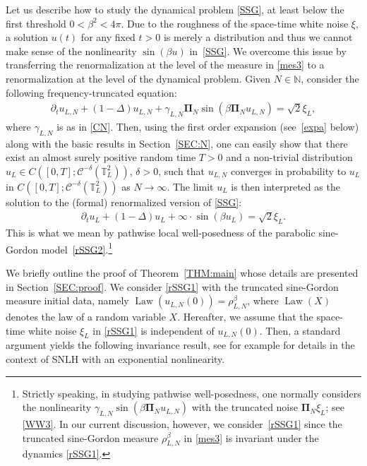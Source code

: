 \documentclass[letterpaper, 11pt,  reqno]{amsart}
\theoremstyle{myremark}
\newcommand{\1}{\hspace{0.5mm}\text{I}\hspace{0.5mm}}
\newcommand{\T}{\mathbb{T}}
\newcommand{\CC}{\mathcal{C}}
\newcommand{\Pii}{\mathbf{\Pi}}
\newcommand{\be}{\beta}
\newcommand{\dl}{\delta}
\newcommand{\Dl}{\Delta}
\newcommand{\g}{\gamma}
\newcommand{\dt}{\partial_t}
\newcommand{\N}{\mathbb{N}}
\DeclareMathOperator{\Law}{Law}
\numberwithin{equation}{section}
\numberwithin{theorem}{section}
\begin{document}
Let us describe  how to study the dynamical problem \eqref{SSG}, 
at least below the first threshold $0 < \be^2 < 4\pi$. %
Due to the roughness of the space-time white noise $\xi$, 
a solution $u(t)$ for any fixed $t > 0$ is merely a distribution and 
thus we cannot make sense of the nonlinearity $\sin(\be u)$ in~\eqref{SSG}. 
We  overcome this issue by 
transferring  the renormalization  at the level of the measure 
in  \eqref{mes3}
 to a renormalization  at the level of the dynamical problem.
Given $N \in \N$, consider the following 
 frequency-truncated equation:
\begin{align}
 \dt u_{L, N}  + (1-\Dl)  u_{L, N} 
+ \g_{L, N} \Pii_{N} \sin (\be \Pii_{N} u_{L, N})  = \sqrt{2} \xi_L , 
\label{rSSG1}
\end{align}
where $\g_{L, N}$ is as in \eqref{CN}.
Then, 
using the first order expansion (see~\eqref{expa} below)
along with the basic results in Section~\ref{SEC:N}, 
one can easily show
 that there exist an almost surely positive random time $T>0$ and a non-trivial distribution 
$u_L \in C([0,T]; \CC^{-\dl}(\T_L^2))$, $\dl > 0$, such that 
$u_{L, N}$ converges 
in probability 
to $u_L$
in 
$C([0,T]; \CC^{-\dl}(\T_L^2))$ as $N \to \infty$.
The limit $u_L$ is then interpreted as the solution to the (formal) renormalized version of \eqref{SSG}:
\begin{align}
\dt u_L +(1-\Dl) u_L   +  \infty\cdot  \sin(\be u_L) = \sqrt{2}\xi_L.
\label{rSSG2}
\end{align}
This is what we mean by pathwise local well-posedness
of the parabolic sine-Gordon model~\eqref{rSSG2}.\footnote{Strictly speaking, 
in studying pathwise well-posedness, 
one normally considers the nonlinearity
$\g_{L, N} \sin (\be \Pii_{N} u_{L, N})$
with the truncated noise 
 $\Pii_{N} \xi_L$; see \eqref{WW3}.
In our current discussion, however, 
we consider~\eqref{rSSG1}
since the truncated sine-Gordon measure $\rho^\be_{L, N}$ in \eqref{mes3}
is invariant under the dynamics \eqref{rSSG1}.}





We briefly outline the proof of 
Theorem~\ref{THM:main}
whose details are presented in Section~\ref{SEC:proof}.
We consider 
 \eqref{rSSG1}
 with the truncated sine-Gordon measure initial data, namely
$\Law(u_{L, N}(0)) = \rho_{L, N}^\be$, 
where $\Law(X)$ denotes the law of a random variable $X$.
Hereafter, we assume that the space-time white noise $\xi_L$
in \eqref{rSSG1} is independent
of $u_{L, N}(0)$.
Then, 
a standard argument yields  the following invariance result,
see for example 
\cite[Subsection 5.2]{ORW}
for details
in the context of  SNLH 
with an exponential nonlinearity.
\end{document}
